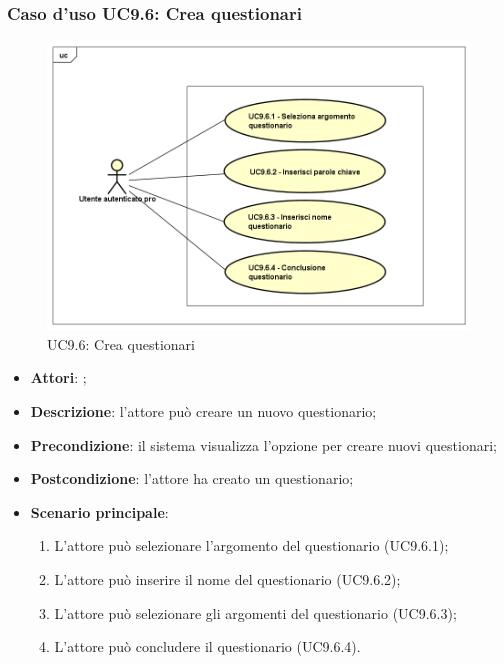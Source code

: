 	\subsubsection{Caso d'uso UC9.6: Crea questionari}
	\label{UC9.6}
	\begin{figure}[h]
		\centering
	\includegraphics[scale=0.5,keepaspectratio]{UML/UC9_6.png}
		\caption{UC9.6: Crea questionari}
	\end{figure}
	\FloatBarrier
	\begin{itemize}
		\item \textbf{Attori}: \uaupro{};
		\item \textbf{Descrizione}: l'attore può creare un nuovo questionario; 
		\item \textbf{Precondizione}: il sistema visualizza l'opzione per creare nuovi questionari;
		\item \textbf{Postcondizione}: l'attore ha creato un questionario;
		\item \textbf{Scenario principale}:
			\begin{enumerate}
				\item L'attore può selezionare l'argomento del questionario (UC9.6.1);
				\item L'attore può inserire il nome del questionario (UC9.6.2);
				\item L'attore può selezionare gli argomenti del questionario (UC9.6.3);
				\item L'attore può concludere il questionario (UC9.6.4).
			\end{enumerate}
	\end{itemize}
	
